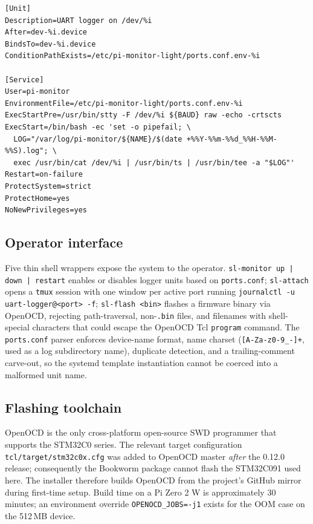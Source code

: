 \documentclass[11pt,a4paper]{article}
\begin{document}
\begin{lstlisting}[language=systemd,caption={Excerpt of the systemd
template unit. The \texttt{ExecStart} pipeline is the entire data
path; everything else is policy. \texttt{ConditionPathExists} silently
skips the unit for ports not present in \texttt{ports.conf}, avoiding
``failed unit'' clutter for irrelevant USB-serial devices.},label={lst:execstart}]
[Unit]
Description=UART logger on /dev/%i
After=dev-%i.device
BindsTo=dev-%i.device
ConditionPathExists=/etc/pi-monitor-light/ports.conf.env-%i

[Service]
User=pi-monitor
EnvironmentFile=/etc/pi-monitor-light/ports.conf.env-%i
ExecStartPre=/usr/bin/stty -F /dev/%i ${BAUD} raw -echo -crtscts
ExecStart=/bin/bash -ec 'set -o pipefail; \
  LOG="/var/log/pi-monitor/${NAME}/$(date +%%Y-%%m-%%d_%%H-%%M-%%S).log"; \
  exec /usr/bin/cat /dev/%i | /usr/bin/ts | /usr/bin/tee -a "$LOG"'
Restart=on-failure
ProtectSystem=strict
ProtectHome=yes
NoNewPrivileges=yes
\end{lstlisting}

\subsection{Operator interface}

Five thin shell wrappers expose the system to the operator.
\texttt{sl-monitor up\,|\,down\,|\,restart} enables or disables logger
units based on \texttt{ports.conf}; \texttt{sl-attach} opens a
\texttt{tmux} session with one window per active port running
\texttt{journalctl -u uart-logger@<port> -f}; \texttt{sl-flash <bin>}
flashes a firmware binary via OpenOCD, rejecting path-traversal,
non-\texttt{.bin} files, and filenames with shell-special characters
that could escape the OpenOCD Tcl \texttt{program} command. The
\texttt{ports.conf} parser enforces device-name format, name charset
(\texttt{[A-Za-z0-9\_-]+}, used as a log subdirectory name),
duplicate detection, and a trailing-comment carve-out, so the systemd
template instantiation cannot be coerced into a malformed unit name.

\subsection{Flashing toolchain}

OpenOCD is the only cross-platform open-source SWD programmer that
supports the STM32C0 series. The relevant target configuration
\texttt{tcl/target/stm32c0x.cfg} was added to OpenOCD master
\emph{after} the 0.12.0 release; consequently the Bookworm package
\cite{debian-openocd} cannot flash the STM32C091 used here. The
installer therefore builds OpenOCD from the project's GitHub mirror
\cite{openocd-mirror} during first-time setup. Build time on a Pi
Zero 2 W is approximately 30 minutes; an environment override
\texttt{OPENOCD\_JOBS=-j1} exists for the OOM case on the 512\,MB
device.
\end{document}
